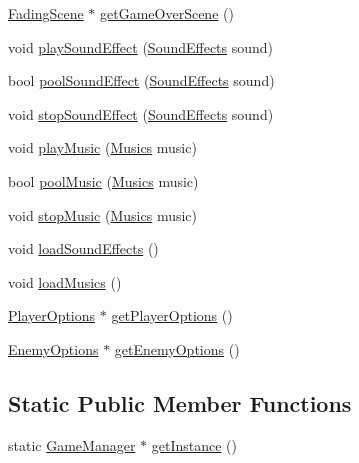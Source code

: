 \begin{DoxyCompactItemize}
\item 
\hyperlink{class_fading_scene}{FadingScene} $\ast$ \hyperlink{class_game_manager_a03758aa600489f5d67df8e2d0d7097b8}{getGameOverScene} ()
\item 
void \hyperlink{class_game_manager_af2909d5c142a689f1e2c36dc5fc951bc}{playSoundEffect} (\hyperlink{class_game_manager_a941d946acccde34eec72708b60aeca66}{SoundEffects} sound)
\item 
bool \hyperlink{class_game_manager_aaf2e99636e9ab6bee0c6aff9ff8b3011}{poolSoundEffect} (\hyperlink{class_game_manager_a941d946acccde34eec72708b60aeca66}{SoundEffects} sound)
\item 
void \hyperlink{class_game_manager_a2c9e7c83d21d5733a6b3b68c801ae4b1}{stopSoundEffect} (\hyperlink{class_game_manager_a941d946acccde34eec72708b60aeca66}{SoundEffects} sound)
\item 
void \hyperlink{class_game_manager_a3e7ea15c8a3018776552571120bb08be}{playMusic} (\hyperlink{class_game_manager_a7fccedb9176b0430b47f50982a89a1d8}{Musics} music)
\item 
bool \hyperlink{class_game_manager_a7cb966aa36acd137fc11a1dd3300802d}{poolMusic} (\hyperlink{class_game_manager_a7fccedb9176b0430b47f50982a89a1d8}{Musics} music)
\item 
void \hyperlink{class_game_manager_a2c061a57ecae805d2ecbb48e3ec32638}{stopMusic} (\hyperlink{class_game_manager_a7fccedb9176b0430b47f50982a89a1d8}{Musics} music)
\item 
void \hyperlink{class_game_manager_a03edfa7e90687a48f676c91e09994247}{loadSoundEffects} ()
\item 
void \hyperlink{class_game_manager_a00a0ac98d2c59a56461635719c4f7d41}{loadMusics} ()
\item 
\hyperlink{struct_game_manager_1_1_player_options}{PlayerOptions} $\ast$ \hyperlink{class_game_manager_a80241730dffcd7ae249aca34a2a1e6b3}{getPlayerOptions} ()
\item 
\hyperlink{struct_game_manager_1_1_enemy_options}{EnemyOptions} $\ast$ \hyperlink{class_game_manager_a2b31b2b116000fd2a46d2da2132122ff}{getEnemyOptions} ()
\end{DoxyCompactItemize}
\subsection*{Static Public Member Functions}
\begin{DoxyCompactItemize}
\item 
static \hyperlink{class_game_manager}{GameManager} $\ast$ \hyperlink{class_game_manager_a00509384dd65ab52c7f3d22d1c7d74f1}{getInstance} ()
\end{DoxyCompactItemize}
